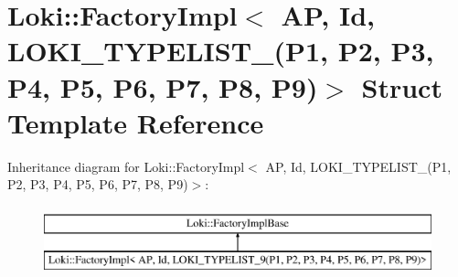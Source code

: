 \hypertarget{structLoki_1_1FactoryImpl_3_01AP_00_01Id_00_01LOKI__TYPELIST__9_07P1_00_01P2_00_01P3_00_01P4_00_61172a57a9caff70ed7c652ec4ff7081}{}\section{Loki\+:\+:Factory\+Impl$<$ A\+P, Id, L\+O\+K\+I\+\_\+\+T\+Y\+P\+E\+L\+I\+S\+T\+\_(P1, P2, P3, P4, P5, P6, P7, P8, P9)$>$ Struct Template Reference}
\label{structLoki_1_1FactoryImpl_3_01AP_00_01Id_00_01LOKI__TYPELIST__9_07P1_00_01P2_00_01P3_00_01P4_00_61172a57a9caff70ed7c652ec4ff7081}
Inheritance diagram for Loki\+:\+:Factory\+Impl$<$ A\+P, Id, L\+O\+K\+I\+\_\+\+T\+Y\+P\+E\+L\+I\+S\+T\+\_(P1, P2, P3, P4, P5, P6, P7, P8, P9)$>$\+:\begin{figure}[H]
\begin{center}
\leavevmode
\includegraphics[height=2.000000cm]{structLoki_1_1FactoryImpl_3_01AP_00_01Id_00_01LOKI__TYPELIST__9_07P1_00_01P2_00_01P3_00_01P4_00_61172a57a9caff70ed7c652ec4ff7081}
\end{center}
\end{figure}
